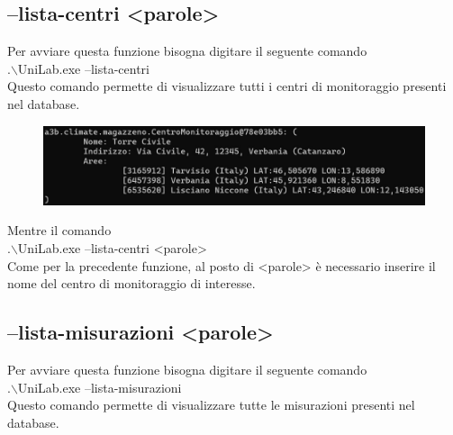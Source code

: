 \documentclass[12pt]{scrreprt}
\begin{document}
		
		\subsection{--lista-centri <parole>}
		
		Per avviare questa funzione bisogna digitare il seguente comando
		\\.$\backslash$UniLab.exe --lista-centri\\
		Questo comando permette di visualizzare tutti i centri di monitoraggio presenti nel database.
		
		\begin{figure}[H]
			\centering
			\includegraphics[width=0.9\linewidth]{Screen/listacentri}
			\caption[Schermata principale]{}
			\label{fig:listacentri}
		\end{figure}
		
		Mentre il comando
		\\.$\backslash$UniLab.exe --lista-centri <parole>\\
		Come per la precedente funzione, al posto di <parole>  è necessario inserire il nome del centro di monitoraggio di interesse.
		
		\subsection{--lista-misurazioni <parole>}
		Per avviare questa funzione bisogna digitare il seguente comando
		\\.$\backslash$UniLab.exe --lista-misurazioni\\
		Questo comando permette di visualizzare tutte le misurazioni presenti nel database.
		
\end{document}
